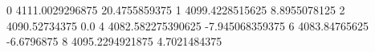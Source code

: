 0 4111.0029296875 20.4755859375
1 4099.4228515625 8.8955078125
2 4090.52734375 0.0
4 4082.582275390625 -7.945068359375
6 4083.84765625 -6.6796875
8 4095.2294921875 4.7021484375
